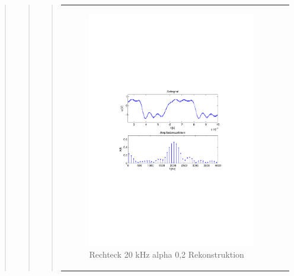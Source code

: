 \begin{quote}
\begin{quote}
\begin{quote}
\begin{center}
\begin{tabular}{ll}
            \hspace{-5cm}
                \begin{minipage}{0.6\textwidth}
                    \begin{figure}[H]
                        \includegraphics[scale=0.7, trim = 35mm 100mm 35mm 95mm, clip]{Bilder/flatrec20_02}
                          \caption{Rechteck 20 kHz alpha 0,2 Rekonstruktion}
		                  \label{fig:flatrec20_02}
                    \end{figure}
                \end{minipage}
                

\end{tabular}
\end{center}
\end{quote}
\end{quote}
\end{quote}
